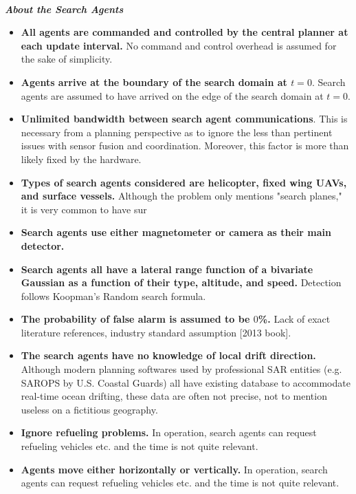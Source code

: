 \documentclass[12pt, letterpaper]{article}  %
\theoremstyle{definition}
\theoremstyle{remark}
\theoremstyle{plain}
\begin{document}
\ \\
\textit{\textbf{About the Search Agents}}
\begin{itemize}
\item \textbf{All agents are commanded and controlled by the central planner at each update interval.} No command and control overhead is assumed for the sake of simplicity.
\item \textbf{Agents arrive at the boundary of the search domain at $t=0$}.  Search agents are assumed to have arrived on the edge of the search domain at $t=0$.
\item \textbf{Unlimited bandwidth between search agent communications}.  This is necessary from a planning perspective as to ignore the less than pertinent issues with sensor fusion and coordination. Moreover, this factor is more than likely fixed by the hardware.
\item \textbf{Types of search agents considered are helicopter, fixed wing UAVs, and surface vessels.} Although the problem only mentions "search planes," it is very common to have sur
\item \textbf{Search agents use either magnetometer or camera as their main detector.}
\item \textbf{Search agents all have a lateral range function of a bivariate Gaussian as a function of their type, altitude, and speed.} Detection follows Koopman's Random search formula.
\item \textbf{The probability of false alarm is assumed to be $0$\%.} Lack of exact literature references, industry standard assumption [2013 book]. 
\item \textbf{The search agents have no knowledge of local drift direction.} Although modern planning softwares used by professional SAR entities (e.g. SAROPS by U.S. Coastal Guards) all have existing database to accommodate real-time ocean drifting, these data are often not precise, not to mention useless on a fictitious geography.
\item \textbf{Ignore refueling problems.} In operation, search agents can request refueling vehicles etc. and the time is not quite relevant.
\item \textbf{Agents move either horizontally or vertically.} In operation, search agents can request refueling vehicles etc. and the time is not quite relevant.

\end{itemize}


\end{document}
